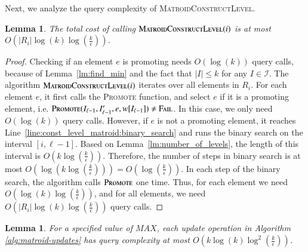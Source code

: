 \documentclass[11pt]{article}
\newtheorem{lemma}[theorem]{Lemma}
\newcommand{\mO}{O}
\newcommand{\mI}{{\mathcal{I}}}
\newcommand{\err}{{\textsc{Fail}}}
\newcommand{\MatroidConstLevel}{\textsc{MatroidConstructLevel}}
\newcommand{\replacementTester}{\textsc{Promote}}
\begin{document}
Next, we analyze the query complexity
of \MatroidConstLevel{}. 
\begin{lemma}
\label{lm:level_query_complexity}
  The total cost of calling $\MatroidConstLevel{}(i)$ is at most
  $\mO\left(|R_i|\log(k)\log\left(\frac{k}{\epsilon}\right)\right)$.
\end{lemma}
\begin{proof}
  Checking if an element $e$ is promoting needs $\mO(\log(k))$ query calls, because
  of Lemma~\ref{lm:find_min} and the fact that $|I|\le k$ for any $I \in \mI$. 
  The algorithm $\MatroidConstLevel{}(i)$ iterates over all elements in $R_i$.
  For each element $e$, it first calls the \replacementTester{} function, and
  select $e$ if it is a promoting element, i.e. $\replacementTester(I_{\ell-1},
  I'_{\ell-1}, e, w[I_{\ell-1}]) \ne \err$. In this case, we only need $\mO(\log(k))$
  query calls. However, if $e$ is not a promoting element, it reaches
  Line~\ref{line:const_level_matroid:binary_search} and runs the binary search
  on the interval $[i,\ell-1]$. Based on Lemma~\ref{lm:number_of_levels}, the
  length of this interval is
  $\mO\left(k\log\left(\frac{k}{\epsilon}\right)\right)$. Therefore, the number
  of steps in binary search is at most
  $\mO\left(\log\left(k\log\left(\frac{k}{\epsilon}\right)\right)\right) =
  \mO\left(\log\left(\frac{k}{\epsilon}\right)\right)$. In each step of the
  binary search, the algorithm calls $\replacementTester$ one time. Thus, for
  each element we need $\mO\left(\log(k)\log\left(\frac{k}{\epsilon}\right)\right)$,
  and for all elements, we need
  $\mO\left(|R_i|\log(k)\log\left(\frac{k}{\epsilon}\right)\right)$ query calls.
\end{proof}
\begin{lemma}
  For a specified value of $MAX$, each update operation in Algorithm \ref{alg:matroid-updates} has query complexity at most
  $\mO\left(k\log(k)\log^2\left(\frac{k}{\epsilon}\right)\right)$.
\end{lemma}
\end{document}
